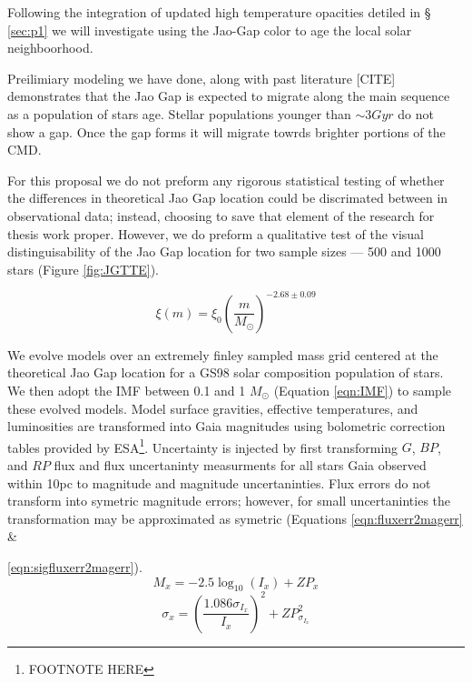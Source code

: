 Following the integration of updated high temperature opacities detiled in \S
\ref{sec:p1} we will investigate using the Jao-Gap color to age the local
solar neighboorhood.

Preilimiary modeling we have done, along with past literature [CITE]
demonstrates that the Jao Gap is expected to migrate along the main sequence as
a population of stars age. Stellar populations younger than $\sim 3 Gyr$ do not
show a gap. Once the gap forms it will migrate towrds brighter portions of the
CMD.

For this proposal we do not preform any rigorous statistical testing of whether
the differences in theoretical Jao Gap location could be discrimated between in
observational data; instead, choosing to save that element of the research for
thesis work proper. However, we do preform a qualitative test of the visual
distinguisability of the Jao Gap location for two sample sizes --- 500 and 1000
stars (Figure \ref{fig:JGTTE}).

\begin{equation}\label{eqn:IMF}
	\xi(m) = \xi_{0}\left(\frac{m}{M_{\odot}}\right)^{-2.68\pm0.09}
\end{equation}

We evolve models over an extremely finley sampled mass grid centered at the
theoretical Jao Gap location for a GS98 solar composition population of stars.
We then adopt the \citep{Sollima2019} IMF between 0.1 and 1 $M_{\odot}$
(Equation \ref{eqn:IMF}) to sample these evolved models. Model surface
gravities, effective temperatures, and luminosities are transformed into Gaia
magnitudes using bolometric correction tables provided by ESA\footnote{FOOTNOTE
HERE}. Uncertainty is injected by first transforming $G$, $BP$, and $RP$ flux
and flux uncertaninty measurments for all stars Gaia observed within 10pc to
magnitude and magnitude uncertaninties. Flux errors do not transform into
symetric magnitude errors; however, for small uncertaninties the transformation
may be approximated as symetric (Equations \ref{eqn:fluxerr2magerr} \&

\ref{eqn:sigfluxerr2magerr}).
\begin{equation}\label{eqn:fluxerr2magerr}
	M_{x} = -2.5\log_{10}(I_{x}) + ZP_{x}
\end{equation}
\begin{equation}\label{eqn:sigfluxerr2magerr}
	\sigma_{x} = \left(\frac{1.086\sigma_{I_{x}}}{I_{x}}\right)^{2} + ZP_{\sigma_{I_{x}}}^{2}
\end{equation}

